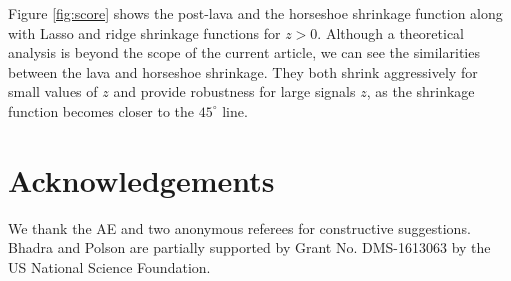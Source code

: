 \documentclass[sts,preprint]{imsart}
\begin{document}
\begin{appendix}
Figure \ref{fig:score} shows the post-lava and the horseshoe shrinkage function along with Lasso and ridge shrinkage functions for $z > 0$. Although a theoretical analysis is beyond the scope of the current article, we can see the similarities between the lava and horseshoe shrinkage. They both shrink aggressively for small values of $z$ and provide robustness for large signals $z$, as the shrinkage function becomes closer to the $45^\circ$ line.
\end{appendix}

\section*{Acknowledgements}
We thank the AE and two anonymous referees for constructive suggestions. Bhadra and Polson are partially supported by Grant No. DMS-1613063 by the US National Science Foundation.



\end{document}
